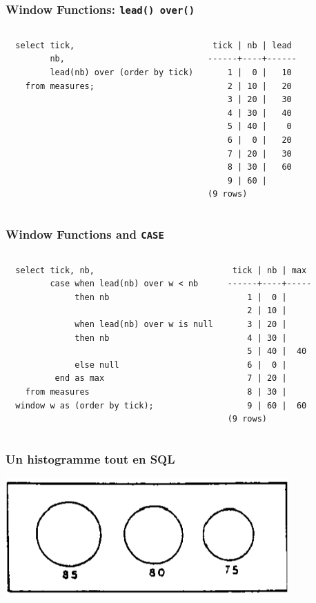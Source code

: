 \documentclass{beamer}
\begin{document}
\begin{frame}[fragile]
  \frametitle{Window Functions: \texttt{lead() over()}}

\begin{columns}
\begin{verbatim}
  select tick,
         nb,
         lead(nb) over (order by tick)
    from measures;
\end{verbatim}

\begin{verbatim}
 tick | nb | lead 
------+----+------
    1 |  0 |   10
    2 | 10 |   20
    3 | 20 |   30
    4 | 30 |   40
    5 | 40 |    0
    6 |  0 |   20
    7 | 20 |   30
    8 | 30 |   60
    9 | 60 |     
(9 rows)
\end{verbatim}
\end{columns}
\end{frame}

\begin{frame}[fragile]
  \frametitle{Window Functions and \texttt{CASE}}

\begin{columns}
\begin{verbatim}
  select tick, nb,
         case when lead(nb) over w < nb
              then nb

              when lead(nb) over w is null
              then nb

              else null
          end as max
    from measures
  window w as (order by tick);
\end{verbatim}
\begin{verbatim}
 tick | nb | max 
------+----+-----
    1 |  0 |    
    2 | 10 |    
    3 | 20 |    
    4 | 30 |    
    5 | 40 |  40
    6 |  0 |    
    7 | 20 |    
    8 | 30 |    
    9 | 60 |  60
(9 rows)
\end{verbatim}
\end{columns}
\end{frame}

\begin{frame}
  \frametitle{Un histogramme tout en SQL}

  \begin{center}
    \includegraphics[height=1.8in]{histogram.png}
  \end{center}
\end{frame}
\end{document}
